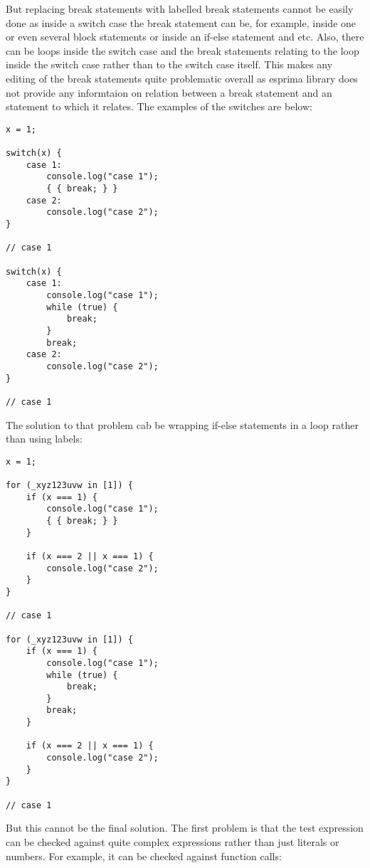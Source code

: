 \documentclass[a4paper]{article}
\begin{document}
But replacing break statements with labelled break statements cannot be easily done as inside a switch case the break statement can be, for example, inside one or even several block statements or inside an if-else statement and etc. Also, there can be loops inside the switch case and the break statements relating to the loop inside the switch case rather than to the switch case itself. This makes any editing of the break statements quite problematic overall as esprima library does not provide any informtaion on relation between a break statement and an statement to which it relates. The examples of the switches are below:

\begin{lstlisting}
x = 1;

switch(x) {
    case 1: 
        console.log("case 1");
        { { break; } }
    case 2:
        console.log("case 2");	
}

// case 1

switch(x) {
    case 1: 
        console.log("case 1");
        while (true) {
            break;
        }
        break;
    case 2:
        console.log("case 2");	
}

// case 1

\end{lstlisting}

The solution to that problem cab be wrapping if-else statements in a loop rather than using labels:

\begin{lstlisting}
x = 1;

for (_xyz123uvw in [1]) {
    if (x === 1) { 
        console.log("case 1");
        { { break; } }
    }
	
    if (x === 2 || x === 1) {
        console.log("case 2");
    }	
}

// case 1

for (_xyz123uvw in [1]) {
    if (x === 1) { 
        console.log("case 1");
        while (true) {
            break;
        }    
        break;
    }
	
    if (x === 2 || x === 1) {
        console.log("case 2");
    }	
}

// case 1

\end{lstlisting}

But this cannot be the final solution. The first problem is that the test expression can be checked against quite complex expressions rather than just literals or numbers. For example, it can be checked against function calls:
\end{document}
